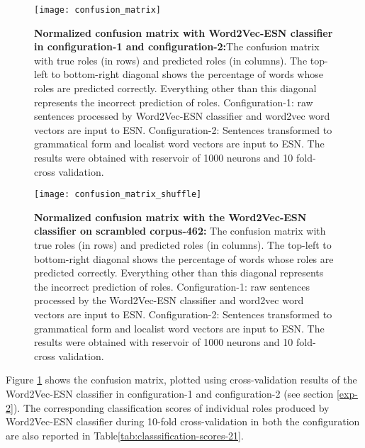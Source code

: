 \begin{figure}[hbtp]
\centering
\texttt{[image: confusion\_matrix]}
\caption[Normalized confusion matrix on corpus 462 with Word2Vec-ESN classifier] {\textbf{Normalized confusion matrix with Word2Vec-ESN classifier in configuration-1 and configuration-2:}{\small The confusion matrix with true roles (in rows) and predicted roles (in columns). The top-left to bottom-right diagonal shows the percentage of words whose roles are predicted correctly. Everything other than this diagonal represents the incorrect prediction of roles. Configuration-1: raw sentences processed by Word2Vec-ESN classifier and word2vec word vectors are input to ESN. Configuration-2: Sentences transformed to grammatical form and localist word vectors are input to ESN. The results were obtained with reservoir of 1000 neurons and 10 fold-cross validation.}}
\label{fig:confusion_matrix}
\end{figure}

\begin{figure}[hbtp]
\centering
\texttt{[image: confusion\_matrix\_shuffle]}
\caption[Normalized confusion matrix on scrambled corpus 462 with Word2Vec-ESN classifier] {\textbf{Normalized confusion matrix with the Word2Vec-ESN classifier on scrambled corpus-462:} The confusion matrix with true roles (in rows) and predicted roles (in columns). The top-left to bottom-right diagonal shows the percentage of words whose roles are predicted correctly. Everything other than this diagonal represents the incorrect prediction of roles. Configuration-1: raw sentences processed by the Word2Vec-ESN classifier and word2vec word vectors are input to ESN. Configuration-2: Sentences transformed to grammatical form and localist word vectors are input to ESN. The results were obtained with reservoir of 1000 neurons and 10 fold-cross validation.}
\label{fig:confusion_matrix_shuffle}
\end{figure}

Figure \ref{fig:confusion_matrix} shows the confusion matrix, plotted using cross-validation results of the Word2Vec-ESN classifier in configuration-1 and configuration-2 (see section \ref{exp-2}). The corresponding classification scores of individual roles produced by Word2Vec-ESN classifier during 10-fold cross-validation in both the configuration are also reported in Table\ref{tab:classsification-scores-21}.

